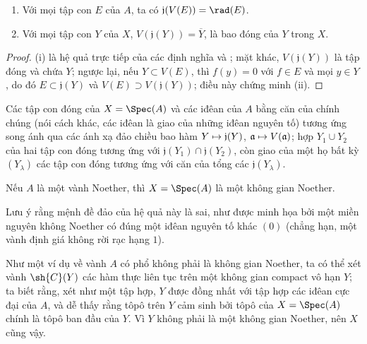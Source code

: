 \documentclass[oneside]{amsart}
\makeatletter
\newcommand{\ega@arrow}[2]{\mathchoice{#1}{#2}{#2}{#2}}
\let\ega@shortmapsto\mapsto
\renewcommand{\mapsto}{\ega@arrow{\longmapsto}{\ega@shortmapsto}}
\let\EGAOriginalLabel\label
\renewcommand{\label}[1]{\phantomsection\EGAOriginalLabel{#1}}
\makeatother
\begin{document}
\begin{proposition}[1.1.4]
\label{I.1.1.4}
\medskip\noindent
\begin{enumerate}
  \item[{\rm(i)}] Với mọi tập con $E$ của $A$, ta có $\mathfrak{j}(V(E))=\rad(E)$.
  \item[{\rm(ii)}] Với mọi tập con $Y$ của $X$, $V(\mathfrak{j}(Y))=\overline{Y}$, là bao đóng của $Y$ trong $X$.
\end{enumerate}
\end{proposition}

\begin{proof}
(i) là hệ quả trực tiếp của các định nghĩa và ;
mặt khác, $V(\mathfrak{j}(Y))$ là tập đóng và chứa $Y$;
ngược lại, nếu $Y\subset V(E)$, thì $f(y)=0$ với $f\in E$ và mọi $y\in Y$, do đó $E\subset\mathfrak{j}(Y)$ và $V(E)\supset V(\mathfrak{j}(Y))$; điều này chứng minh (ii).
\end{proof}

\begin{corollary}[1.1.5]
\label{I.1.1.5}
Các tập con đóng của $X=\Spec(A)$ và các iđêan của $A$ bằng căn của chính chúng (nói cách khác, các iđêan là giao của những iđêan nguyên tố) tương ứng song ánh qua các ánh xạ đảo chiều bao hàm $Y\mapsto\mathfrak{j}(Y)$, $\mathfrak{a}\mapsto V(\mathfrak{a})$;
hợp $Y_1\cup Y_2$ của hai tập con đóng tương ứng với $\mathfrak{j}(Y_1)\cap\mathfrak{j}(Y_2)$, còn giao của một họ bất kỳ $(Y_\lambda)$ các tập con đóng tương ứng với căn của tổng các $\mathfrak{j}(Y_\lambda)$.
\end{corollary}

\begin{corollary}[1.1.6]
\label{I.1.1.6}
Nếu $A$ là một vành Noether, thì $X=\Spec(A)$ là một không gian Noether.
\end{corollary}

Lưu ý rằng mệnh đề đảo của hệ quả này là sai, như được minh họa bởi một miền nguyên không Noether có đúng một iđêan nguyên tố khác $(0)$ (chẳng hạn, một vành định giá không rời rạc hạng $1$).

Như một ví dụ về vành $A$ có phổ không phải là không gian Noether, ta có thể xét vành $\sh{C}(Y)$ các hàm thực liên tục trên một không gian compact vô hạn $Y$;
ta biết rằng, xét như một tập hợp, $Y$ được đồng nhất với tập hợp các iđêan cực đại của $A$, và dễ thấy rằng tôpô trên $Y$ cảm sinh bởi tôpô của $X=\Spec(A)$ chính là tôpô ban đầu của $Y$.
Vì $Y$ không phải là một không gian Noether, nên $X$ cũng vậy.
\end{document}
